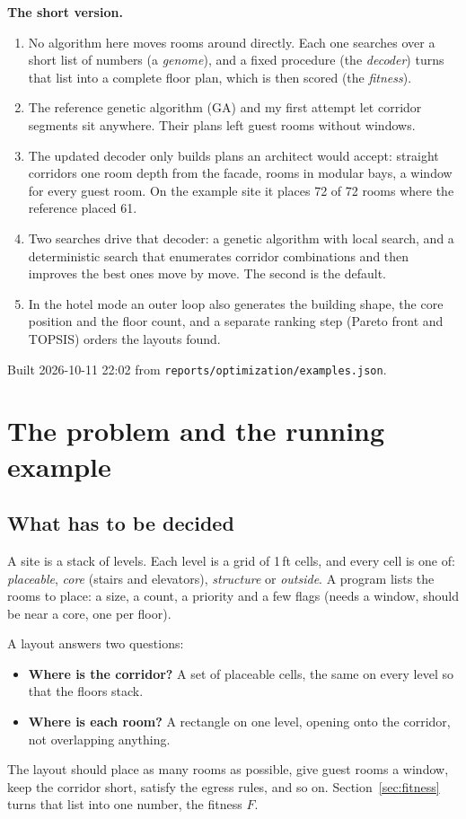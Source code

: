 \documentclass[10pt,a4paper]{article}
\newcommand{\code}[1]{\texttt{\small #1}}
\begin{document}
\begin{titlepage}
\begin{minipage}{0.88\linewidth}
\textbf{The short version.}
\begin{enumerate}
\item No algorithm here moves rooms around directly. Each one searches over a short list of numbers (a \emph{genome}),
and a fixed procedure (the \emph{decoder}) turns that list into a complete floor plan, which is then scored (the
\emph{fitness}).
\item The reference genetic algorithm (GA) and my first attempt let corridor segments sit anywhere. Their plans left
guest rooms without windows.
\item The updated decoder only builds plans an architect would accept: straight corridors one room depth from the
facade, rooms in modular bays, a window for every guest room. On the example site it places 72 of 72
rooms where the reference placed 61.
\item Two searches drive that decoder: a genetic algorithm with local search, and a deterministic search that
enumerates corridor combinations and then improves the best ones move by move. The second is the default.
\item In the hotel mode an outer loop also generates the building shape, the core position and the floor count, and a
separate ranking step (Pareto front and TOPSIS) orders the layouts found.
\end{enumerate}
\end{minipage}
\vfill
{\small\color{muted} Built 2026-10-11 22:02 from \code{reports/optimization/examples.json}.}
\end{titlepage}
\tableofcontents
\clearpage


\section{The problem and the running example}
\subsection{What has to be decided}
A site is a stack of levels. Each level is a grid of 1\,ft cells, and every cell is one of: \emph{placeable},
\emph{core} (stairs and elevators), \emph{structure} or \emph{outside}. A program lists the rooms to place: a size,
a count, a priority and a few flags (needs a window, should be near a core, one per floor).

A layout answers two questions:
\begin{itemize}
\item \textbf{Where is the corridor?} A set of placeable cells, the same on every level so that the floors stack.
\item \textbf{Where is each room?} A rectangle on one level, opening onto the corridor, not overlapping anything.
\end{itemize}
The layout should place as many rooms as possible, give guest rooms a window, keep the corridor short, satisfy the
egress rules, and so on. Section~\ref{sec:fitness} turns that list into one number, the fitness $F$.
\end{document}
